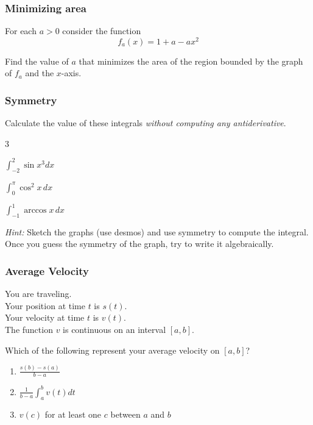 \documentclass[14pt]{beamer}
\begin{document}
\begin{frame}[t]
	\frametitle{Minimizing area}

	For each $a >0$ consider the function
	\[
		f_{a}(x) = 1 + a -ax^{2}
	\]

	Find the value of $a$ that minimizes the area of the region bounded by the graph
	of $f_{a}$ and the $x$-axis. \hfill
	\href{https://www.desmos.com/calculator/x7vkfcerdp}{}
\end{frame}

\begin{frame}[t]
	\frametitle{Symmetry}

	Calculate the value of these integrals \emph{without computing any
	antiderivative}.

	\begin{enumerate}
	\end{enumerate}

	\emph{Hint:} Sketch the graphs (use desmos) and use symmetry to compute the integral.
	\\ Once you guess the symmetry of the graph, try to write it algebraically.
	\hfill
	\href{https://www.desmos.com/calculator/ncysdsu3yv}{\beamergotobutton{1}}
	\href{https://www.desmos.com/calculator/fwjs5zoury}{\beamergotobutton{2}}
	\href{https://www.desmos.com/calculator/tjakgza6vf}{\beamergotobutton{3}}
\end{frame}

\begin{frame}[t]
	\fontsize{13}{13}\selectfont
	\frametitle{Average Velocity}

	You are traveling. \\ Your position at time $t$ is $s(t)$. \\ Your velocity at
	time $t$ is $v(t)$. \\ The function $v$ is continuous on an interval $[a,b]$.

	Which of the following represent your average velocity on $[a,b]$?

	\begin{enumerate}
		\item $\displaystyle \frac{s(b) - s(a)}{b-a}$

		\item $\displaystyle \frac{1}{b-a}\int_{a}^{b}v(t) dt$

		\item $v(c)$ for at least one $c$ between $a$ and $b$
	\end{enumerate}
\end{frame}
\end{document}
